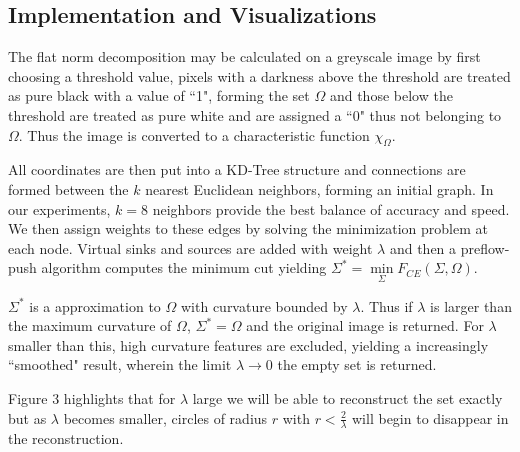 \documentclass[12pt]{article}
\begin{document}
\subsection{Implementation and Visualizations}

The flat norm decomposition may be calculated on a greyscale image by first choosing a threshold value, pixels with a darkness above the threshold are treated as pure black with a value of ``1", forming the set $\Omega$ and those below the threshold are treated as pure white and are assigned a ``0" thus not belonging to $\Omega$. Thus the image is converted to a characteristic function $\chi_\Omega$.

All coordinates are then put into a KD-Tree structure and connections are formed between the $k$ nearest Euclidean neighbors, forming an initial graph. In our experiments, $k = 8$ neighbors provide the best balance of accuracy and speed. We then assign weights to these edges by solving the minimization problem at each node. Virtual sinks and sources are added with weight $\lambda$ and then a preflow-push algorithm computes the minimum cut yielding $\Sigma^* = \min\limits_\Sigma F_{CE}(\Sigma,\Omega)$.

$\Sigma^*$ is a approximation to $\Omega$ with curvature bounded by $\lambda$. Thus if $\lambda$ is larger than the maximum curvature of $\Omega$, $\Sigma^* = \Omega$ and the original image is returned. For $\lambda$ smaller than this, high curvature features are excluded, yielding a increasingly ``smoothed" result, wherein the limit $\lambda \to 0$ the empty set is returned.

Figure 3 highlights that for $\lambda$ large we will be able to reconstruct the set exactly but as $\lambda$ becomes smaller, circles of radius $r$ with $r < \frac{2}{\lambda}$ will begin to disappear in the reconstruction.
\end{document}
